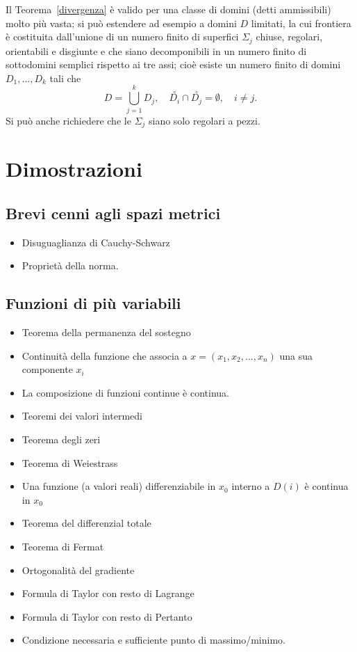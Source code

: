 \documentclass[a4paper]{book}
\numberwithin{equation}{section}
\theoremstyle{plain}
\theoremstyle{definition}
\theoremstyle{remark}
\theoremstyle{example}
\begin{document}
	Il Teorema~\ref{divergenza} è valido per una classe di domini (detti ammissibili) molto più vasta; si può estendere ad esempio a domini $D$ limitati, la cui frontiera è costituita dall'unione di un numero finito di superfici $\Sigma_j$ chiuse, regolari, orientabili e disgiunte e che siano decomponibili in un numero finito di sottodomini semplici rispetto ai tre assi; cioè esiste un numero finito di domini $D_1, \dots, D_k$ tali che
	\begin{equation*}
		D=\bigcup_{j=1}^k D_j, \quad \overset{\circ}{D_i}\cap\overset{\circ}{D_j} = \emptyset, \quad i \ne j.
	\end{equation*}
	Si può anche richiedere che le $\Sigma_j$ siano solo regolari a pezzi.

	\appendix \chapter{Dimostrazioni}
	\section{Brevi cenni agli spazi metrici}
	\begin{itemize}
		\item Disuguaglianza di Cauchy-Schwarz
		\item Proprietà della norma.
	\end{itemize}
	\section{Funzioni di più variabili}
	\begin{itemize}
		\item Teorema della permanenza del sostegno
		\item Continuità della funzione che associa a $x=(x_1,x_2,...,x_n)$ una sua componente $x_i$
		\item La composizione di funzioni continue è continua.
		\item Teoremi dei valori intermedi
		\item Teorema degli zeri
		\item Teorema di Weiestrass
		\item Una funzione (a valori reali) differenziabile in $x_0$ interno a $D(i)$ è continua in $x_0$
		\item Teorema del differenzial totale
		\item Teorema di Fermat
		\item Ortogonalità del gradiente
		\item Formula di Taylor con resto di Lagrange
		\item Formula di Taylor con resto di Pertanto
		\item Condizione necessaria e sufficiente punto di massimo/minimo.
	\end{itemize}
\end{document}
